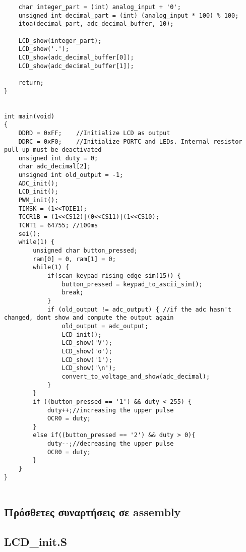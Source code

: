 \documentclass{article}
\begin{document}
\begin{verbatim}
	char integer_part = (int) analog_input + '0';
	unsigned int decimal_part = (int) (analog_input * 100) % 100;
	itoa(decimal_part, adc_decimal_buffer, 10);
	
	LCD_show(integer_part);
	LCD_show('.');
	LCD_show(adc_decimal_buffer[0]);
	LCD_show(adc_decimal_buffer[1]);
	
	return;
}


int main(void)
{
	DDRD = 0xFF;	//Initialize LCD as output
	DDRC = 0xF0;	//Initialize PORTC and LEDs. Internal resistor pull up must be deactivated
	unsigned int duty = 0;
	char adc_decimal[2];
	unsigned int old_output = -1;
	ADC_init();
	LCD_init();
	PWM_init();
	TIMSK = (1<<TOIE1);
	TCCR1B = (1<<CS12)|(0<<CS11)|(1<<CS10);
	TCNT1 = 64755; //100ms
	sei();
	while(1) {
		unsigned char button_pressed;
		ram[0] = 0, ram[1] = 0;
		while(1) {
			if(scan_keypad_rising_edge_sim(15)) {
				button_pressed = keypad_to_ascii_sim();
				break;
			}
			if (old_output != adc_output) { //if the adc hasn't changed, dont show and compute the output again
				old_output = adc_output;
				LCD_init();
				LCD_show('V');
				LCD_show('o');
				LCD_show('1');
				LCD_show('\n');
				convert_to_voltage_and_show(adc_decimal);
			}
		}
		if ((button_pressed == '1') && duty < 255) {
			duty++;//increasing the upper pulse
			OCR0 = duty;
		}
		else if((button_pressed == '2') && duty > 0){
			duty--;//decreasing the upper pulse
			OCR0 = duty;
		}
	}
}


\end{verbatim}



\subsection*{Πρόσθετες συναρτήσεις σε assembly}

\subsection*{LCD\_init.S}
\end{document}
